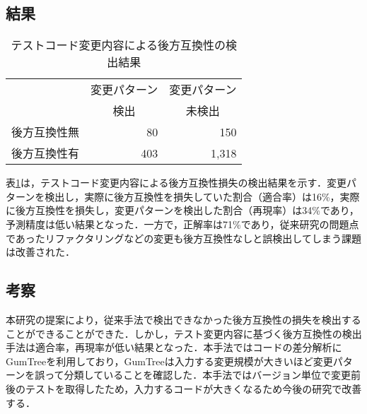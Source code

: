 \documentclass[T,J]{fose} %
\begin{document}
\vspace{-10pt}
\subsection{結果}

\begin{table}[]
\centering
\caption{テストコード変更内容による後方互換性の検出結果}
\begin{tabular}{l|r|r}
\hline
\multicolumn{1}{c|}{} & \multicolumn{1}{c|}{変更パターン} & \multicolumn{1}{c}{変更パターン} \\ 
\multicolumn{1}{c|}{} & \multicolumn{1}{c|}{検出} & \multicolumn{1}{c}{未検出} \\ \hline
後方互換性無 & 80 & 150 \\ \hline
後方互換性有 & 403 & 1,318 \\ \hline
\end{tabular}
\label{table_pattern}
\end{table}


表\ref{table_pattern}は，テストコード変更内容による後方互換性損失の検出結果を示す．変更パターンを検出し，実際に後方互換性を損失していた割合（適合率）は16\%，実際に後方互換性を損失し，変更パターンを検出した割合（再現率）は34\%であり，予測精度は低い結果となった．一方で，正解率は71\%であり，従来研究の問題点であったリファクタリングなどの変更も後方互換性なしと誤検出してしまう課題は改善された．

\vspace{-10pt}
\subsection{考察}
本研究の提案により，従来手法で検出できなかった後方互換性の損失を検出することができることができた．しかし，テスト変更内容に基づく後方互換性の検出手法は適合率，再現率が低い結果となった．本手法ではコードの差分解析にGumTreeを利用しており，GumTreeは入力する変更規模が大きいほど変更パターンを誤って分類していることを確認した．本手法ではバージョン単位で変更前後のテストを取得したため，入力するコードが大きくなるため今後の研究で改善する．


\end{document}
